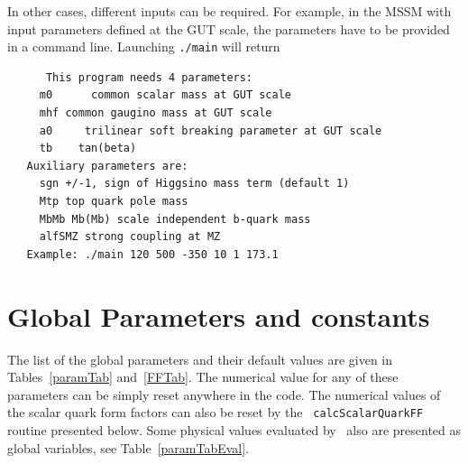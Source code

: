 \documentclass[12pt,a4paper]{article}
\begin{document}
In other cases, different inputs can be required. For example, in the MSSM with input parameters defined at the GUT scale,
the parameters have to be provided in a command line. Launching \verb|./main| will return 
\begin{verbatim}
      This program needs 4 parameters:
     m0      common scalar mass at GUT scale
     mhf common gaugino mass at GUT scale
     a0     trilinear soft breaking parameter at GUT scale
     tb    tan(beta)
   Auxiliary parameters are:
     sgn +/-1, sign of Higgsino mass term (default 1)
     Mtp top quark pole mass
     MbMb Mb(Mb) scale independent b-quark mass
     alfSMZ strong coupling at MZ
   Example: ./main 120 500 -350 10 1 173.1
\end{verbatim}



\section{Global Parameters and constants}
\label{sec:global_parameters}

The list of the global parameters  and their default values  are given  in Tables~\ref{paramTab} and~\ref{FFTab}. 
The numerical value for any of these parameters can be simply reset anywhere in the code. 
The numerical values of  the scalar quark form factors can also be reset by the {\tt
calcScalarQuarkFF} routine presented below. Some physical values  evaluated by \micro\  also are presented as global variables,  see Table~\ref{paramTabEval}. 
\end{document}
